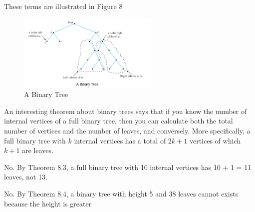 \documentclass{report}
\begin{document}
{\centerline{{\large{These terms are illustrated in Figure {8}}}}}
\pagebreak
\begin{figure}[ht]
\centering
\includegraphics[width=0.6\textwidth]{ binarytree.png }
\caption{A Binary Tree}
\end{figure}
\bigbreak \noindent
An interesting theorem about binary trees says that if you know the number of internal vertices of a full binary tree, then you can calculate both the total number of vertices and the number of leaves, and conversely. More specifically, a full binary tree with $k$ internal vertices has a total of $2 k+1$ vertices of which $k+1$ are leaves.
\bigbreak \noindent
{}
\bigbreak \noindent \bigbreak \noindent
{}

No. By Theorem 8.3, a full binary tree with 10 internal vertices has 10 + 1 = 11 leaves, not 13.
\bigbreak \noindent \bigbreak \noindent
{}
\bigbreak \noindent \bigbreak \noindent
{}


No. By Theorem 8.4, a binary tree with height 5 and 38 leaves cannot exists because the height is greater 
\end{document}
